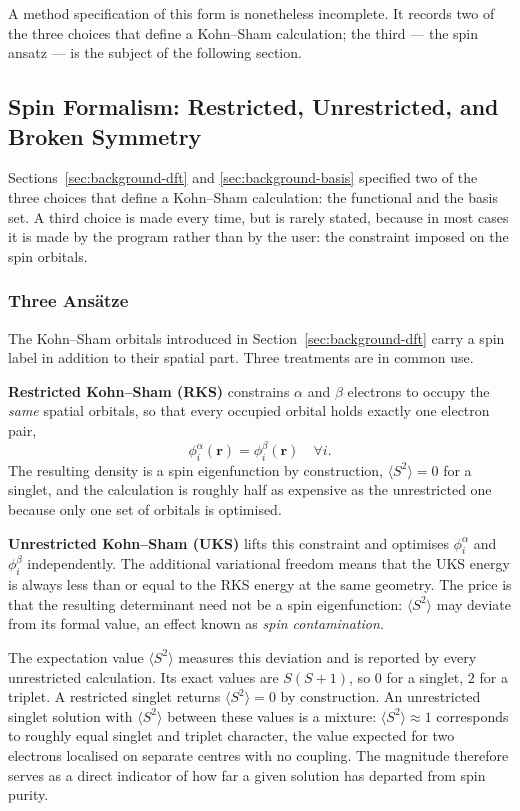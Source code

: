 A method specification of this form is nonetheless incomplete. It records two of
the three choices that define a Kohn--Sham calculation; the third --- the spin
ansatz --- is the subject of the following section.

\subsection{Spin Formalism: Restricted, Unrestricted, and Broken Symmetry}
\label{sec:background-spin}

Sections~\ref{sec:background-dft} and \ref{sec:background-basis} specified two of
the three choices that define a Kohn--Sham calculation: the functional and the
basis set. A third choice is made every time, but is rarely stated, because in
most cases it is made by the program rather than by the user: the constraint
imposed on the spin orbitals.

\subsubsection{Three Ansätze}

The Kohn--Sham orbitals introduced in Section~\ref{sec:background-dft} carry a
spin label in addition to their spatial part. Three treatments are in common use.

\textbf{Restricted Kohn--Sham (RKS)} constrains $\alpha$ and $\beta$ electrons to
occupy the \emph{same} spatial orbitals, so that every occupied orbital holds
exactly one electron pair,
%
\begin{equation}
  \phi_i^\alpha(\mathbf{r}) = \phi_i^\beta(\mathbf{r}) \quad \forall i .
\end{equation}
%
The resulting density is a spin eigenfunction by construction, $\langle S^2
\rangle = 0$ for a singlet, and the calculation is roughly half as expensive as
the unrestricted one because only one set of orbitals is optimised.

\textbf{Unrestricted Kohn--Sham (UKS)} lifts this constraint and optimises
$\phi_i^\alpha$ and $\phi_i^\beta$ independently. The additional variational
freedom means that the UKS energy is always less than or equal to the RKS energy
at the same geometry. The price is that the resulting determinant need not be a
spin eigenfunction: $\langle S^2 \rangle$ may deviate from its formal value, an
effect known as \emph{spin contamination}.

The expectation value $\langle S^2 \rangle$ measures this deviation and is
reported by every unrestricted calculation. Its exact values are $S(S+1)$, so
$0$ for a singlet, $2$ for a triplet. A restricted singlet returns $\langle S^2
\rangle = 0$ by construction. An unrestricted singlet solution with $\langle S^2
\rangle$ between these values is a mixture: $\langle S^2 \rangle \approx 1$
corresponds to roughly equal singlet and triplet character, the value expected
for two electrons localised on separate centres with no coupling. The magnitude
therefore serves as a direct indicator of how far a given solution has departed
from spin purity.

